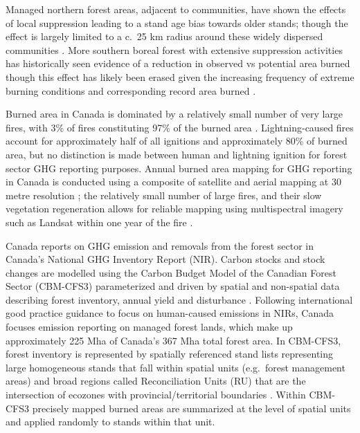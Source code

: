 \documentclass[, manuscript]{copernicus}
\begin{document}
Managed northern forest areas, adjacent to communities, have shown the
effects of local suppression leading to a stand age bias towards older
stands; though the effect is largely limited to a c.~25 km radius around
these widely dispersed communities \citep{parisien2020}. More southern
boreal forest with extensive suppression activities has historically
seen evidence of a reduction in observed vs potential area burned
\citep{cummingEffectiveFireSuppression2005} though this effect has
likely been erased given the increasing frequency of extreme burning
conditions \citet{wangCriticalFireWeather2023} and corresponding record
area burned \citep{jainDriversImpactsRecordBreaking2024}.

Burned area in Canada is dominated by a relatively small number of very
large fires, with 3\% of fires constituting 97\% of the burned area
\citep{stocks2002}. Lightning-caused fires account for approximately
half of all ignitions and approximately 80\% of burned area, but no
distinction is made between human and lightning ignition for forest
sector GHG reporting purposes. Annual burned area mapping for GHG
reporting in Canada is conducted using a composite of satellite and
aerial mapping at 30 metre resolution \citep{hall2020}; the relatively
small number of large fires, and their slow vegetation regeneration
\citep{white2017} allows for reliable mapping using multispectral
imagery such as Landsat within one year of the fire \citep{whitman2018}.

Canada reports on GHG emission and removals from the forest sector in
Canada's National GHG Inventory Report (NIR). Carbon stocks and stock
changes are modelled using the Carbon Budget Model of the Canadian
Forest Sector (CBM-CFS3) \citep{kurzCBMCFS3ModelCarbondynamics2009}
parameterized and driven by spatial and non-spatial data describing
forest inventory, annual yield and disturbance
\citep{stinsonInventorybasedAnalysisCanadas2011}. Following
international good practice guidance to focus on human-caused emissions
in NIRs, Canada focuses emission reporting on managed forest lands,
which make up approximately 225 Mha of Canada's 367 Mha total forest
area. In CBM-CFS3, forest inventory is represented by spatially
referenced stand lists representing large homogeneous stands that fall
within spatial units (e.g.~forest management areas) and broad regions
called Reconciliation Units (RU) that are the intersection of ecozones
with provincial/territorial boundaries \citep{kurz2002}. Within CBM-CFS3
precisely mapped burned areas are summarized at the level of spatial
units and applied randomly to stands within that unit.
\end{document}
